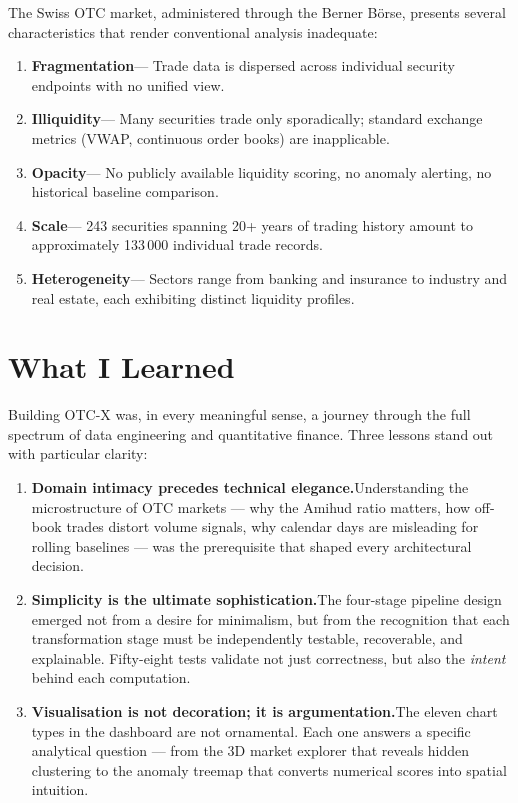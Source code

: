\documentclass[
  11pt,
  a4paper,
  twoside,
  openany
]{report}
\begin{document}
The Swiss OTC market, administered through the Berner Börse, presents several characteristics that render conventional analysis inadequate:

\begin{enumerate}[label=\textcolor{SwissRed}{\textbf{\arabic*.}}]
  \item \textbf{Fragmentation}\;— Trade data is dispersed across individual security endpoints with no unified view.
  \item \textbf{Illiquidity}\;— Many securities trade only sporadically; standard exchange metrics (VWAP, continuous order books) are inapplicable.
  \item \textbf{Opacity}\;— No publicly available liquidity scoring, no anomaly alerting, no historical baseline comparison.
  \item \textbf{Scale}\;— 243 securities spanning 20+ years of trading history amount to approximately 133\,000 individual trade records.
  \item \textbf{Heterogeneity}\;— Sectors range from banking and insurance to industry and real estate, each exhibiting distinct liquidity profiles.
\end{enumerate}

\section{What I Learned}

Building OTC-X was, in every meaningful sense, a journey through the full spectrum of data engineering and quantitative finance.  Three lessons stand out with particular clarity:

\begin{enumerate}[label=\textcolor{MetricBlue}{\textbf{(\roman*)}}]
  \item \textbf{Domain intimacy precedes technical elegance.}\;Understanding the microstructure of OTC markets — why the Amihud ratio matters, how off-book trades distort volume signals, why calendar days are misleading for rolling baselines — was the prerequisite that shaped every architectural decision.
  \item \textbf{Simplicity is the ultimate sophistication.}\;The four-stage pipeline design emerged not from a desire for minimalism, but from the recognition that each transformation stage must be independently testable, recoverable, and explainable.  Fifty-eight tests validate not just correctness, but also the \emph{intent} behind each computation.
  \item \textbf{Visualisation is not decoration; it is argumentation.}\;The eleven chart types in the dashboard are not ornamental.  Each one answers a specific analytical question — from the 3D market explorer that reveals hidden clustering to the anomaly treemap that converts numerical scores into spatial intuition.
\end{enumerate}
\end{document}
